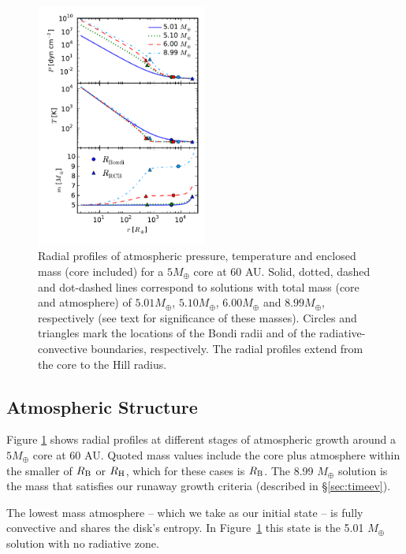 \documentclass[apj, numberedappendix]{emulateapj}
\newcommand{\Fig}[1]{Figure~\ref{#1}}
\newcommand{\RB}{R_{\rm B}}
\newcommand{\RH}{R_{\rm H}}
\begin{document}
\begin{figure}[tb]
\centering
\includegraphics[width=0.5\textwidth]{PTm_profiles_v2_smallM.pdf}
\caption{Radial profiles of atmospheric pressure, temperature and enclosed mass (core included) for a $5 M_{\oplus}$ core at $60$ AU.   Solid, dotted, dashed and dot-dashed lines correspond to solutions with total mass (core and atmosphere) of $5.01 M_{\oplus}$, $5.10 M_{\oplus}$, $6.00 M_{\oplus}$ and $8.99 M_{\oplus}$, respectively (see text for significance of these masses).  Circles and triangles mark the locations of the Bondi radii and of the radiative-convective boundaries, respectively.  The radial profiles extend from the core to the Hill radius.} %
\label{fig:profiles}
\end{figure}


\subsection{Atmospheric Structure}
\label{sec:profiles}
Figure \ref{fig:profiles} shows radial profiles at different stages of atmospheric growth around a $5 M_{\oplus}$ core at $60$ AU.  Quoted mass values include the core plus atmosphere within the smaller of $\RB$ or $\RH$, which for these cases is $\RB$.  The 8.99 $M_{\oplus}$ solution is the mass 
that satisfies our runaway growth criteria (described in \S\ref{sec:timeev}). %

The lowest mass atmosphere -- which we take as our initial state -- is fully convective and shares the disk's entropy.  In \Fig{fig:profiles} this state is the 5.01 $M_{\oplus}$ solution with no radiative zone.
\end{document}
